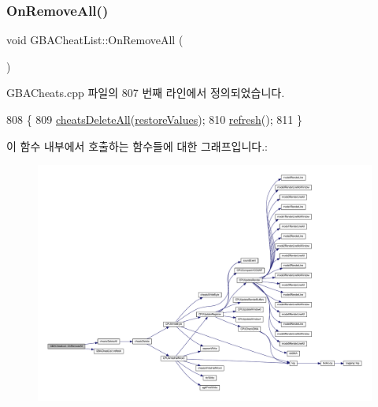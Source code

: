\subsubsection{\texorpdfstring{On\+Remove\+All()}{OnRemoveAll()}}
{\footnotesize\ttfamily void G\+B\+A\+Cheat\+List\+::\+On\+Remove\+All (\begin{DoxyParamCaption}{ }\end{DoxyParamCaption})\hspace{0.3cm}{\ttfamily [protected]}}



G\+B\+A\+Cheats.\+cpp 파일의 807 번째 라인에서 정의되었습니다.


\begin{DoxyCode}
808 \{
809   \mbox{\hyperlink{_cheats_8cpp_a153b7dcab7a44b09e747a1cd88f810de}{cheatsDeleteAll}}(\mbox{\hyperlink{class_g_b_a_cheat_list_a5a6fa66317a2fdab0f9880bd2056c1d0}{restoreValues}});
810   \mbox{\hyperlink{class_g_b_a_cheat_list_a12928bb674926ae02d5a3ceb156a3b53}{refresh}}();
811 \}
\end{DoxyCode}
이 함수 내부에서 호출하는 함수들에 대한 그래프입니다.\+:
\nopagebreak
\begin{figure}[H]
\begin{center}
\leavevmode
\includegraphics[width=350pt]{class_g_b_a_cheat_list_a41727af1d277cd0ac71b80e992b55ec9_cgraph}
\end{center}
\end{figure}
\mbox{\label{class_g_b_a_cheat_list_a0fe16ba1b246f6baa133926505681012}} 
